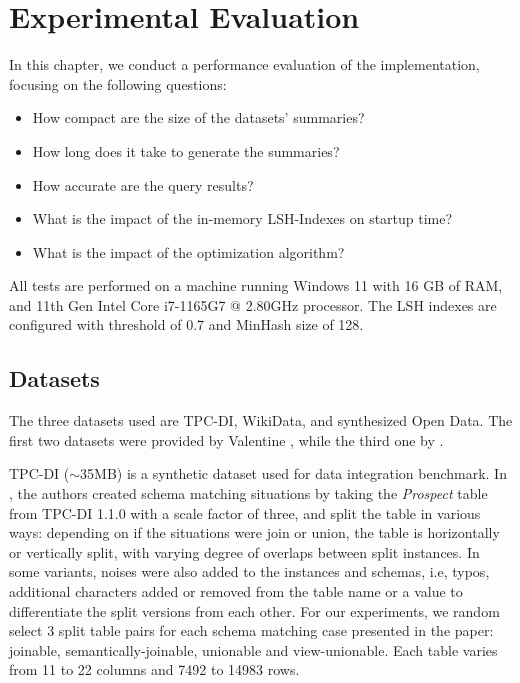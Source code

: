 


\chapter{Experimental Evaluation}
\label{chap:experimentalevaluation}
\pagestyle{plain}

In this chapter, we conduct a performance evaluation of the implementation, focusing on the following questions:

\begin{itemize}
    \item How compact are the size of the datasets' summaries?
    \item How long does it take to generate the summaries?
    \item How accurate are the query results?
    \item What is the impact of the in-memory LSH-Indexes on startup time?
    \item What is the impact of the optimization algorithm?
\end{itemize}

All tests are performed on a machine running Windows 11 with 16 GB of RAM, and 11th Gen Intel Core i7-1165G7 @ 2.80GHz processor. The LSH indexes are configured with threshold of 0.7 and MinHash size of 128.

\section{Datasets}

The three datasets used are TPC-DI, WikiData, and synthesized Open Data. The first two datasets were provided by Valentine \cite{valentine}, while the third one by \cite{tusZhu}.

TPC-DI ($\sim$35MB) is a synthetic dataset used for data integration benchmark. In \cite{valentine}, the authors created schema matching situations by taking the \textit{Prospect} table from TPC-DI 1.1.0 with a scale factor of three, and split the table in various ways: depending on if the situations were join or union, the table is horizontally or vertically split, with varying degree of overlaps between split instances. In some variants, noises were also added to the instances and schemas, i.e, typos, additional characters added or removed from the table name or a value to differentiate the split versions from each other. For our experiments, we random select 3 split table pairs for each schema matching case presented in the paper: joinable, semantically-joinable, unionable and view-unionable. Each table varies from 11 to 22 columns and 7492 to 14983 rows.

